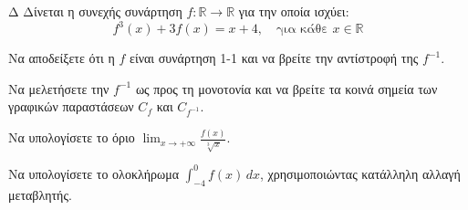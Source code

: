 \begin{thema}{Δ}
Δίνεται η συνεχής συνάρτηση $f: \mathbb{R} \to \mathbb{R}$ για την οποία ισχύει:
\[ f^3(x) + 3f(x) = x + 4, \quad \text{για κάθε } x \in \mathbb{R} \]
\begin{erwthma}
    \item Να αποδείξετε ότι η $f$ είναι συνάρτηση 1-1 και να βρείτε την αντίστροφή της $f^{-1}$.
    \item Να μελετήσετε την $f^{-1}$ ως προς τη μονοτονία και να βρείτε τα κοινά σημεία των γραφικών παραστάσεων $C_f$ και $C_{f^{-1}}$.
    \item Να υπολογίσετε το όριο $\displaystyle{\lim_{x\to +\infty} \frac{f(x)}{\sqrt[3]{x}}}$.
    \item Να υπολογίσετε το ολοκλήρωμα $\displaystyle\int_{-4}^{0} f(x)\,dx$, χρησιμοποιώντας κατάλληλη αλλαγή μεταβλητής.
\end{erwthma}
\end{thema}
